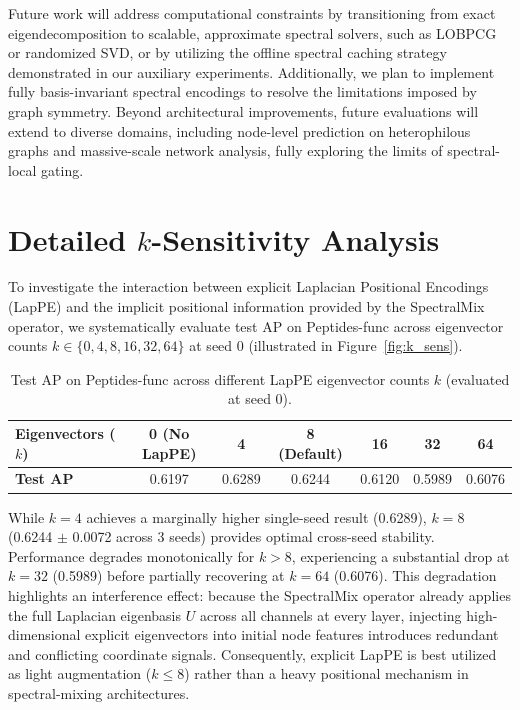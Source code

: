 \documentclass[10pt]{article}
\begin{document}
Future work will address computational constraints by transitioning from exact eigendecomposition to scalable, approximate spectral solvers, such as LOBPCG or randomized SVD, or by utilizing the offline spectral caching strategy demonstrated in our auxiliary experiments. Additionally, we plan to implement fully basis-invariant spectral encodings to resolve the limitations imposed by graph symmetry. Beyond architectural improvements, future evaluations will extend to diverse domains, including node-level prediction on heterophilous graphs and massive-scale network analysis, fully exploring the limits of spectral-local gating.





\appendix

\section{Detailed $k$-Sensitivity Analysis}
\label{app:k_sensitivity}

To investigate the interaction between explicit Laplacian Positional Encodings (LapPE) and the implicit positional information provided by the SpectralMix operator, we systematically evaluate test AP on Peptides-func across eigenvector counts $k \in \{0, 4, 8, 16, 32, 64\}$ at seed 0 (illustrated in Figure~\ref{fig:k_sens}).

\begin{table}[h]
\centering
\caption{Test AP on Peptides-func across different LapPE eigenvector counts $k$ (evaluated at seed 0).}
\label{tab:k_sens_app}
\begin{tabular}{lcccccc}
\toprule
\textbf{Eigenvectors ($k$)} & \textbf{0 (No LapPE)} & \textbf{4} & \textbf{8 (Default)} & \textbf{16} & \textbf{32} & \textbf{64} \\
\midrule
\textbf{Test AP} & 0.6197 & 0.6289 & 0.6244 & 0.6120 & 0.5989 & 0.6076 \\
\bottomrule
\end{tabular}
\end{table}

While $k=4$ achieves a marginally higher single-seed result (0.6289), $k=8$ (0.6244 $\pm$ 0.0072 across 3 seeds) provides optimal cross-seed stability. Performance degrades monotonically for $k > 8$, experiencing a substantial drop at $k=32$ (0.5989) before partially recovering at $k=64$ (0.6076). This degradation highlights an interference effect: because the SpectralMix operator already applies the full Laplacian eigenbasis $U$ across all channels at every layer, injecting high-dimensional explicit eigenvectors into initial node features introduces redundant and conflicting coordinate signals. Consequently, explicit LapPE is best utilized as light augmentation ($k \le 8$) rather than a heavy positional mechanism in spectral-mixing architectures.
\end{document}
